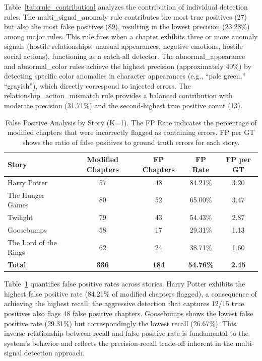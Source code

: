 Table~\ref{tab:rule_contribution} analyzes the contribution of individual detection rules. The multi\_signal\_anomaly rule contributes the most true positives (27) but also the most false positives (89), resulting in the lowest precision (23.28\%) among major rules. This rule fires when a chapter exhibits three or more anomaly signals (hostile relationships, unusual appearances, negative emotions, hostile social actions), functioning as a catch-all detector. The abnormal\_appearance and abnormal\_color rules achieve the highest precision (approximately 40\%) by detecting specific color anomalies in character appearances (e.g., ``pale green,'' ``grayish''), which directly correspond to injected errors. The relationship\_action\_mismatch rule provides a balanced contribution with moderate precision (31.71\%) and the second-highest true positive count (13).

\begin{table}[htbp]
\centering
\caption{False Positive Analysis by Story (K=1). The FP Rate indicates the percentage of modified chapters that were incorrectly flagged as containing errors. FP per GT shows the ratio of false positives to ground truth errors for each story.}
\label{tab:fp_analysis}
\begin{tabular}{lcccc}
\toprule
\textbf{Story} & \textbf{Modified Chapters} & \textbf{FP Chapters} & \textbf{FP Rate} & \textbf{FP per GT} \\
\midrule
Harry Potter & 57 & 48 & 84.21\% & 3.20 \\
The Hunger Games & 80 & 52 & 65.00\% & 3.47 \\
Twilight & 79 & 43 & 54.43\% & 2.87 \\
Goosebumps & 58 & 17 & 29.31\% & 1.13 \\
The Lord of the Rings & 62 & 24 & 38.71\% & 1.60 \\
\midrule
\textbf{Total} & \textbf{336} & \textbf{184} & \textbf{54.76\%} & \textbf{2.45} \\
\bottomrule
\end{tabular}
\end{table}

Table~\ref{tab:fp_analysis} quantifies false positive rates across stories. Harry Potter exhibits the highest false positive rate (84.21\% of modified chapters flagged), a consequence of achieving the highest recall; the aggressive detection that captures 12/15 true positives also flags 48 false positive chapters. Goosebumps shows the lowest false positive rate (29.31\%) but correspondingly the lowest recall (26.67\%). This inverse relationship between recall and false positive rate is fundamental to the system's behavior and reflects the precision-recall trade-off inherent in the multi-signal detection approach.

